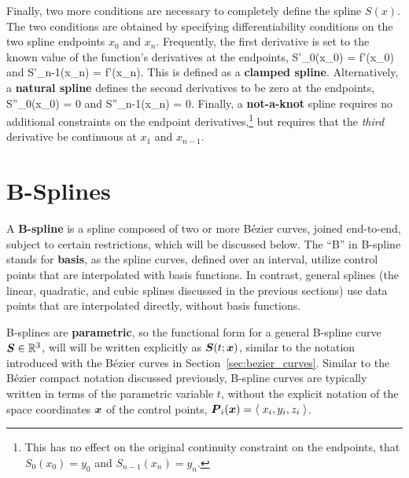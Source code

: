 Finally, two more conditions are necessary to completely define the spline
$S(x)$.  The two conditions are obtained by specifying differentiability
conditions on the two spline endpoints $x_0$ and $x_n$.  
Frequently, the first derivative is set to the known value of the function's
derivatives at the endpoints, 
\be
S'_0(x_0) = f'(x_0) 
\;\mbox{and}\; 
S'_{n-1}(x_n) = f'(x_n).
\ee
This is defined as a {\bf clamped spline}.
Alternatively, a {\bf natural spline} defines the second derivatives to be
zero at the endpoints, 
\be
S''_0(x_0) = 0 
\;\mbox{and}\; 
S''_{n-1}(x_n) = 0.
\ee
Finally, a {\bf not-a-knot} spline requires no additional constraints on the 
endpoint derivatives,\footnote{This has no effect on the original continuity
constraint on the endpoints, that $S_0(x_0) = y_0$ and $S_{n-1}(x_n) = y_n$.}
but requires that the {\em third} derivative be continuous at $x_1$ and 
$x_{n-1}$.

\section{B-Splines}
A {\bf B-spline} is a spline composed of two or more B\'ezier curves, joined 
end-to-end, subject to certain restrictions, which will be discussed below.
The ``B'' in B-spline stands for {\bf basis}, as the spline
curves, defined over an interval, utilize
control points that are interpolated with basis functions.
In contrast, 
general splines (\eg the linear, quadratic, and cubic 
splines discussed in the previous sections)
use data points that are interpolated directly, without basis functions.

B-splines are {\bf parametric}, so the functional form for a general
B-spline curve $\mbox{\boldmath $S$} \in \mathbb{R}^3$, will will be written
explicitly as $\mbox{\boldmath $S$}(t; \mbox{\boldmath $x$})$, similar to the notation introduced with
the B\'ezier curves in Section~\ref{sec:bezier_curves}.  Similar to
the B\'ezier 
compact notation discussed previously, B-spline 
curves are typically written in terms of the parametric variable $t$, without
the explicit notation of the space coordinates 
$\mbox{\boldmath $x$}$ of the control points, \ie $\mbox{\boldmath $P$}_i(\mbox{\boldmath $x$}) = \langle \; x_i, y_i, z_i
\; \rangle$.

